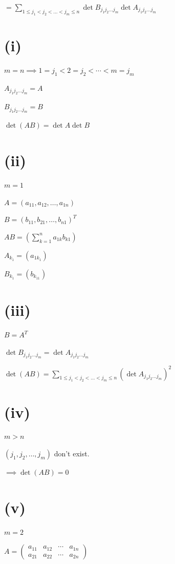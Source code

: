 \documentclass{article}
\begin{document}
\( = \sum_{1\leq j_1 < j_2 < \ldots < j_m \leq n} \det B_{j_1j_2\ldots j_m} \det A_{j_1j_2\ldots j_m} \)

\section*{(i)}

\( m = n \implies 1 = j_1 < 2=j_2 < \cdots < m = j_m \)

\( A_{j_1j_2\ldots j_m} = A \)

\( B_{j_1j_2\ldots j_m} = B \)

\( \det (AB) = \det A \det B \)

\section*{(ii)}

\( m = 1 \)

\( A = (a_{11}, a_{12}, \ldots, a_{1n}) \)

\( B = (b_{11}, b_{21}, \ldots, b_{n1})^T \)

\( AB = (\sum_{k=1}^{n} a_{1k}b_{k1}) \)

\( A_{k_1} = (a_{1k_1}) \)

\( B_{k_1} = (b_{k_11}) \)

\section*{(iii)}

\( B = A^T \)

\( \det B_{j_1j_2\ldots j_m} = \det A_{j_1j_2\ldots j_m} \)

\( \det(AB) = \sum_{1\leq j_1 < j_2 < \ldots < j_m \leq n} (\det A_{j_1j_2\ldots j_m})^2 \)

\section*{(iv)}

\( m > n \)

\( (j_1,j_2,\ldots,j_m) \) don't exist.

\( \implies \det(AB) = 0 \)

\section*{(v)}

\( m = 2 \)

\( A = \left(\begin{matrix} a_{11} & a_{12} & \cdots & a_{1n} \\ a_{21} & a_{22} & \cdots & a_{2n} \end{matrix}\right) \)
\end{document}
